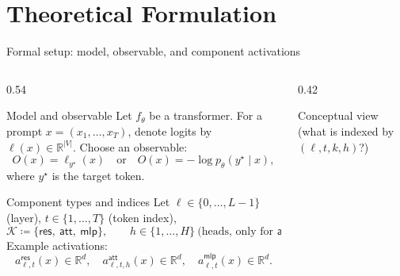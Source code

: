 \documentclass[aspectratio=169,xcolor={dvipsnames}]{beamer}
\newcommand{\R}{\mathbb{R}}
\begin{document}
\section{Theoretical Formulation}




\begin{frame}[shrink=28]{Formal setup: model, observable, and component activations}
\small
\begin{columns}[T,onlytextwidth]
\begin{column}{0.54\textwidth}
\begin{block}{Model and observable}
Let $f_\theta$ be a transformer. For a prompt $x=(x_1,\dots,x_T)$, denote logits by
$\bm{\ell}(x)\in\R^{|V|}$. Choose an observable:
\[
O(x)=\ell_{y^\star}(x)
\quad\text{or}\quad
O(x)=-\log p_\theta(y^\star\mid x),
\]
where $y^\star$ is the target token.
\end{block}

\begin{block}{Component types and indices}
Let $\ell\in\{0,\dots,L-1\}$ (layer), $t\in\{1,\dots,T\}$ (token index),
\[
\mathcal{K} \coloneqq \{\textsf{res},\ \textsf{att},\ \textsf{mlp}\},
\qquad
h\in\{1,\dots,H\}\ \text{(heads, only for }\textsf{att}\text{)}.
\]
Example activations:
\[
a_{\ell,t}^{\textsf{res}}(x)\in\R^d,\quad
a_{\ell,t,h}^{\textsf{att}}(x)\in\R^d,\quad
a_{\ell,t}^{\textsf{mlp}}(x)\in\R^d.
\]
\end{block}
\end{column}

\begin{column}{0.42\textwidth}
\begin{block}{Conceptual view (what is indexed by $(\ell,t,k,h)$?)}
\centering
{}
\end{block}
\end{column}
\end{columns}
\end{frame}
\end{document}

